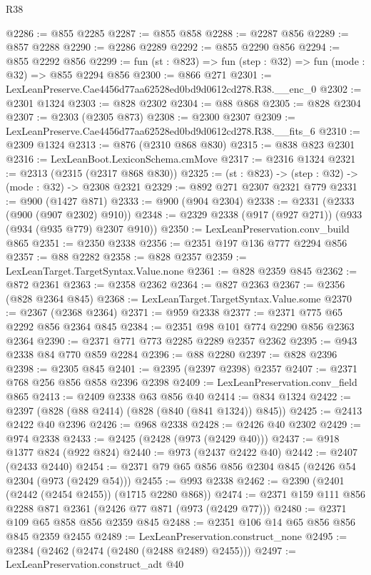 \begin{lexlean}{R38}
\begin{coremodule}
@2286 := @855 @2285
@2287 := @855 @858
@2288 := @2287 @856
@2289 := @857 @2288
@2290 := @2286 @2289
@2292 := @855 @2290 @856
@2294 := @855 @2292 @856
@2299 := fun (st : @823) => fun (step : @32) => fun (mode : @32) => @855 @2294 @856
@2300 := @866 @271
@2301 := LexLeanPreserve.Cae4456d77aa62528ed0bd9d0612cd278.R38.__enc_0
@2302 := @2301 @1324
@2303 := @828 @2302
@2304 := @88 @868
@2305 := @828 @2304
@2307 := @2303 (@2305 @873)
@2308 := @2300 @2307
@2309 := LexLeanPreserve.Cae4456d77aa62528ed0bd9d0612cd278.R38.__fits_6
@2310 := @2309 @1324
@2313 := @876 (@2310 @868 @830)
@2315 := @838 @823 @2301
@2316 := LexLeanBoot.LexiconSchema.cmMove
@2317 := @2316 @1324
@2321 := @2313 (@2315 (@2317 @868 @830))
@2325 := (st : @823) -> (step : @32) -> (mode : @32) -> @2308 @2321
@2329 := @892 @271 @2307 @2321 @779
@2331 := @900 (@1427 @871)
@2333 := @900 (@904 @2304)
@2338 := @2331 (@2333 (@900 (@907 @2302) @910))
@2348 := @2329 @2338 (@917 (@927 @271)) (@933 (@934 (@935 @779) @2307 @910))
@2350 := LexLeanPreservation.conv_build @865
@2351 := @2350 @2338
@2356 := @2351 @197 @136 @777 @2294 @856
@2357 := @88 @2282
@2358 := @828 @2357
@2359 := LexLeanTarget.TargetSyntax.Value.none
@2361 := @828 @2359 @845
@2362 := @872 @2361
@2363 := @2358 @2362
@2364 := @827 @2363
@2367 := @2356 (@828 @2364 @845)
@2368 := LexLeanTarget.TargetSyntax.Value.some
@2370 := @2367 (@2368 @2364)
@2371 := @959 @2338
@2377 := @2371 @775 @65 @2292 @856 @2364 @845
@2384 := @2351 @98 @101 @774 @2290 @856 @2363 @2364
@2390 := @2371 @771 @773 @2285 @2289 @2357 @2362
@2395 := @943 @2338 @84 @770 @859 @2284
@2396 := @88 @2280
@2397 := @828 @2396
@2398 := @2305 @845
@2401 := @2395 (@2397 @2398) @2357
@2407 := @2371 @768 @256 @856 @858 @2396 @2398
@2409 := LexLeanPreservation.conv_field @865
@2413 := @2409 @2338 @63 @856 @40
@2414 := @834 @1324
@2422 := @2397 (@828 (@88 @2414) (@828 (@840 (@841 @1324)) @845))
@2425 := @2413 @2422 @40 @2396
@2426 := @968 @2338
@2428 := @2426 @40 @2302
@2429 := @974 @2338
@2433 := @2425 (@2428 (@973 (@2429 @40)))
@2437 := @918 @1377 @824 (@922 @824)
@2440 := @973 (@2437 @2422 @40)
@2442 := @2407 (@2433 @2440)
@2454 := @2371 @79 @65 @856 @856 @2304 @845 (@2426 @54 @2304 (@973 (@2429 @54)))
@2455 := @993 @2338
@2462 := @2390 (@2401 (@2442 (@2454 @2455)) (@1715 @2280 @868))
@2474 := @2371 @159 @111 @856 @2288 @871 @2361 (@2426 @77 @871 (@973 (@2429 @77)))
@2480 := @2371 @109 @65 @858 @856 @2359 @845
@2488 := @2351 @106 @14 @65 @856 @856 @845 @2359 @2455
@2489 := LexLeanPreservation.construct_none
@2495 := @2384 (@2462 (@2474 (@2480 (@2488 @2489) @2455)))
@2497 := LexLeanPreservation.construct_adt @40

\end{coremodule}
\end{lexlean}
